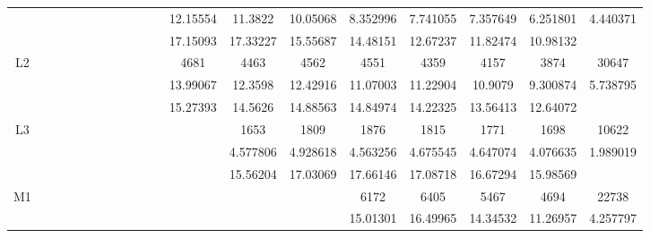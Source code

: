 \begin{table}
{\begin{tabular}{c|cccccccccccccccccc}
            &          &          &          &          &          &          &          &          &          &          &    12.15554&     11.3822&    10.05068&    8.352996&    7.741055&    7.357649&    6.251801&    4.440371\\
            &          &          &          &          &          &          &          &          &          &          &    17.15093&    17.33227&    15.55687&    14.48151&    12.67237&    11.82474&    10.98132&          \\\midrule
\multirow{3}{*}{L2}            &          &          &          &          &          &          &          &          &          &          &        4681&        4463&        4562&        4551&        4359&        4157&        3874&       30647\\
            &          &          &          &          &          &          &          &          &          &          &    13.99067&     12.3598&    12.42916&    11.07003&    11.22904&     10.9079&    9.300874&    5.738795\\
            &          &          &          &          &          &          &          &          &          &          &    15.27393&     14.5626&    14.88563&    14.84974&    14.22325&    13.56413&    12.64072&          \\\midrule
\multirow{3}{*}{L3}            &          &          &          &          &          &          &          &          &          &          &          &        1653&        1809&        1876&        1815&        1771&        1698&       10622\\
            &          &          &          &          &          &          &          &          &          &          &          &    4.577806&    4.928618&    4.563256&    4.675545&    4.647074&    4.076635&    1.989019\\
            &          &          &          &          &          &          &          &          &          &          &          &    15.56204&    17.03069&    17.66146&    17.08718&    16.67294&    15.98569&          \\\midrule
\multirow{3}{*}{M1}            &          &          &          &          &          &          &          &          &          &          &          &          &          &        6172&        6405&        5467&        4694&       22738\\
            &          &          &          &          &          &          &          &          &          &          &          &          &          &    15.01301&    16.49965&    14.34532&    11.26957&    4.257797\\

\end{tabular}}
\end{table}
